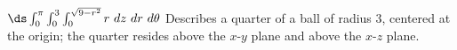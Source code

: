 {
$\ds \int_0^{\pi}\int_0^3\int_0^{\sqrt{9-r^2}} r\ dz\ dr\ d\theta$
}
{Describes a quarter of a ball of radius 3, centered at the origin; the quarter resides above the $x$-$y$ plane and above the $x$-$z$ plane. 
}

